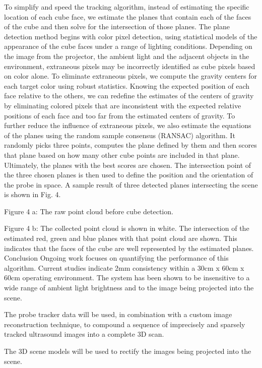 \documentclass{llncs}
\begin{document}
To simplify and speed the tracking algorithm, instead of estimating the specific location of each cube face, we estimate the planes that contain each of the faces of the cube and then solve for the intersection of those planes. The plane detection method begins with color pixel detection, using statistical models of the appearance of the cube faces under a range of lighting conditions. Depending on the image from the projector, the ambient light and the adjacent objects in the environment, extraneous pixels may be incorrectly identified as cube pixels based on color alone. To eliminate extraneous pixels, we compute the gravity centers for each target color using robust statistics. Knowing the expected position of each face relative to the others, we can redefine the estimates of the centers of gravity by eliminating colored pixels that are inconsistent with the expected relative positions of each face and too far from the estimated centers of gravity. To further reduce the influence of extraneous pixels, we also estimate the equations of the planes using the random sample consensus (RANSAC) algorithm. It randomly picks three points, computes the plane defined by them and then scores that plane based on how many other cube points are included in that plane. Ultimately, the planes with the best scores are chosen. The intersection point of the three chosen planes is then used to define the position and the orientation of the probe in space. A sample result of three detected planes intersecting the scene is shown in Fig. 4.


Figure 4 a: The raw point cloud before cube detection.

Figure 4 b: The collected point cloud is shown in white. The intersection of the estimated red, green and blue planes with that point cloud are shown. This indicates that the faces of the cube are well represented by the estimated planes.
Conclusion
Ongoing work focuses on quantifying the performance of this algorithm.  Current studies indicate 2mm consistency within a 30cm x 60cm x 60cm operating environment.  The system has been shown to be insensitive to a wide range of ambient light brightness and to the image being projected into the scene.

The probe tracker data will be used, in combination with a custom image reconstruction technique, to compound a sequence of imprecisely and sparsely tracked ultrasound images into a complete 3D scan.

The 3D scene models will be used to rectify the images being projected into the scene.
\end{document}
